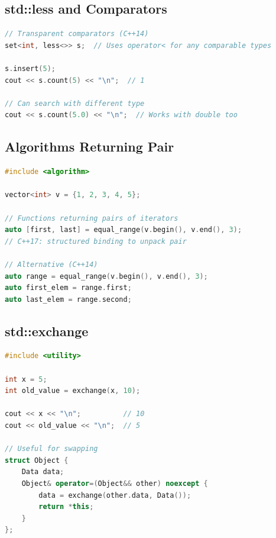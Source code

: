 \hypertarget{stdless-and-comparators}{%
\subsection{std::less and Comparators}\label{stdless-and-comparators}}

\begin{lstlisting}[language={C++}]
// Transparent comparators (C++14)
set<int, less<>> s;  // Uses operator< for any comparable types

s.insert(5);
cout << s.count(5) << "\n";  // 1

// Can search with different type
cout << s.count(5.0) << "\n";  // Works with double too
\end{lstlisting}

\hypertarget{algorithms-returning-pair}{%
\subsection{Algorithms Returning Pair}\label{algorithms-returning-pair}}

\begin{lstlisting}[language={C++}]
#include <algorithm>

vector<int> v = {1, 2, 3, 4, 5};

// Functions returning pairs of iterators
auto [first, last] = equal_range(v.begin(), v.end(), 3);
// C++17: structured binding to unpack pair

// Alternative (C++14)
auto range = equal_range(v.begin(), v.end(), 3);
auto first_elem = range.first;
auto last_elem = range.second;
\end{lstlisting}

\hypertarget{stdexchange}{%
\subsection{std::exchange}\label{stdexchange}}

\begin{lstlisting}[language={C++}]
#include <utility>

int x = 5;
int old_value = exchange(x, 10);

cout << x << "\n";          // 10
cout << old_value << "\n";  // 5

// Useful for swapping
struct Object {
    Data data;
    Object& operator=(Object&& other) noexcept {
        data = exchange(other.data, Data());
        return *this;
    }
};
\end{lstlisting}

